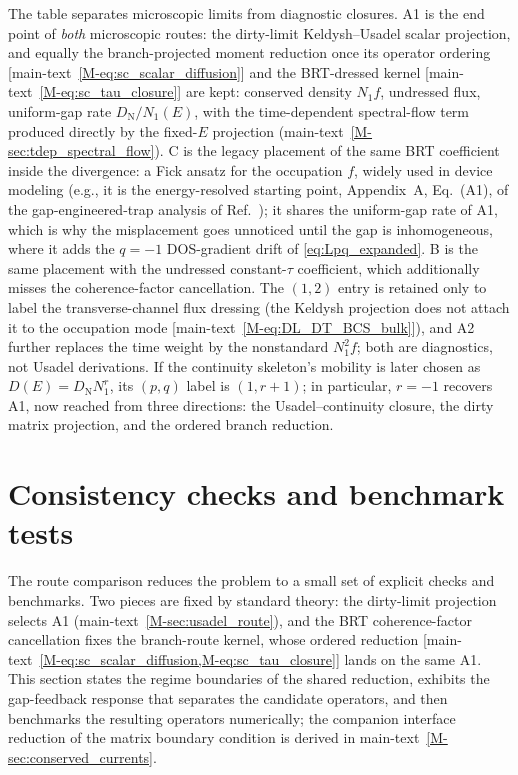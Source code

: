 \documentclass[
  aps,
  prb,
  preprint,
  superscriptaddress,
  longbibliography,
  nofootinbib
]{revtex4-2}
\newcommand{\DOS}{N_1}
\newcommand{\DN}{D_{\mathrm{N}}}
\newcommand{\DE}{D(E)}
\begin{document}
\endgroup

The table separates microscopic limits from diagnostic closures.
A1 is the end point of \emph{both} microscopic routes: the dirty-limit
Keldysh--Usadel scalar projection, and equally the branch-projected
moment reduction once its operator ordering
[main-text~\cref{M-eq:sc_scalar_diffusion}] and the BRT-dressed kernel
[main-text~\cref{M-eq:sc_tau_closure}] are kept: conserved density \(\DOS f\), undressed flux, uniform-gap rate
\(\DN/\DOS(E)\), with the time-dependent spectral-flow term produced
directly by the fixed-\(E\) projection (main-text~\cref{M-sec:tdep_spectral_flow}).
C is the legacy placement of the same BRT coefficient inside the
divergence: a Fick ansatz for the occupation \(f\), widely used in
device modeling (e.g., it is the energy-resolved starting point,
Appendix~A, Eq.~(A1), of the gap-engineered-trap analysis of
Ref.~); it shares the uniform-gap rate of A1, which is why the
misplacement goes unnoticed until the gap is inhomogeneous, where it
adds the \(q=-1\) DOS-gradient drift of \cref{eq:Lpq_expanded}. B is the
same placement with the undressed constant-\(\tau\) coefficient, which
additionally misses the coherence-factor cancellation. The \((1,2)\)
entry is retained only to label the transverse-channel flux
dressing (the Keldysh projection does not attach it to the occupation
mode [main-text~\cref{M-eq:DL_DT_BCS_bulk}]), and A2 further replaces the time
weight by the nonstandard \(\DOS^2 f\); both are diagnostics, not Usadel
derivations. If the continuity skeleton's mobility is later chosen as
\(\DE=\DN\DOS^r\), its \((p,q)\) label is \((1,r+1)\); in particular,
\(r=-1\) recovers A1, now reached from three directions: the
Usadel--continuity closure, the dirty matrix projection, and the ordered
branch reduction.

\section{Consistency checks and benchmark tests}
\label{sec:program}

The route comparison reduces the problem to a small set of explicit
checks and benchmarks. Two pieces are fixed by standard theory: the
dirty-limit projection selects A1 (main-text~\cref{M-sec:usadel_route}),
and the BRT coherence-factor cancellation fixes the branch-route
kernel, whose ordered reduction
[main-text~\cref{M-eq:sc_scalar_diffusion,M-eq:sc_tau_closure}] lands
on the same A1. This section states the regime boundaries of the
shared reduction, exhibits the gap-feedback response that separates
the candidate operators, and then benchmarks the resulting operators
numerically; the companion interface reduction of the matrix boundary
condition is derived in main-text~\cref{M-sec:conserved_currents}.
\end{document}
